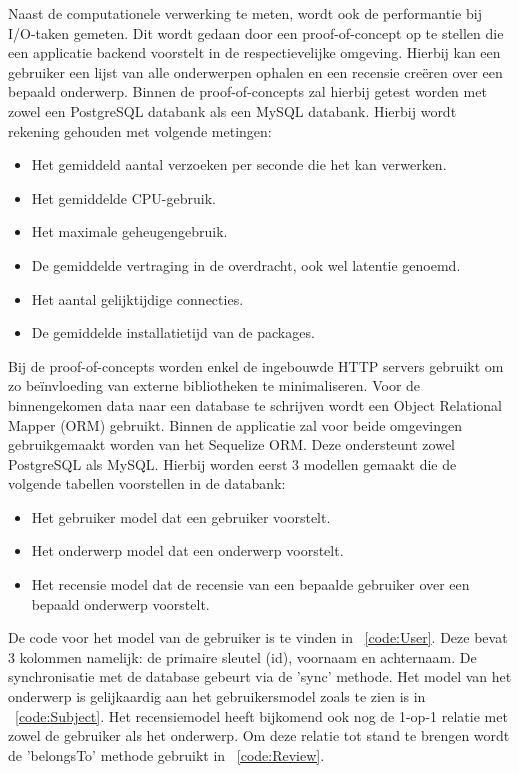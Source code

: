 Naast de computationele verwerking te meten, wordt ook de performantie bij I/O-taken gemeten.
Dit wordt gedaan door een proof-of-concept op te stellen die een applicatie backend voorstelt in de respectievelijke omgeving.
Hierbij kan een gebruiker een lijst van alle onderwerpen ophalen en een recensie creëren over een bepaald onderwerp. 
Binnen de proof-of-concepts zal hierbij getest worden met zowel een PostgreSQL databank als een MySQL databank.
Hierbij wordt rekening gehouden met volgende metingen:
\begin{itemize}
    \item Het gemiddeld aantal verzoeken per seconde die het kan verwerken.
    \item Het gemiddelde CPU-gebruik.
    \item Het maximale geheugengebruik.
    \item De gemiddelde vertraging in de overdracht, ook wel latentie genoemd.
    \item Het aantal gelijktijdige connecties.
    \item De gemiddelde installatietijd van de packages.
\end{itemize}
Bij de proof-of-concepts worden enkel de ingebouwde HTTP servers gebruikt om zo beïnvloeding van externe bibliotheken te minimaliseren.
Voor de binnengekomen data naar een database te schrijven wordt een Object Relational Mapper (ORM) gebruikt.
Binnen de applicatie zal voor beide omgevingen gebruikgemaakt worden van het Sequelize ORM. Deze ondersteunt zowel PostgreSQL als MySQL.
Hierbij worden eerst 3 modellen gemaakt die de volgende tabellen voorstellen in de databank:
\begin{itemize}
  \item Het gebruiker model dat een gebruiker voorstelt.
  \item Het onderwerp model dat een onderwerp voorstelt.
  \item Het recensie model dat de recensie van een bepaalde gebruiker over een bepaald onderwerp voorstelt.
\end{itemize}
De code voor het model van de gebruiker is te vinden in ~\ref{code:User}. Deze bevat 3 kolommen namelijk: de primaire sleutel (id), voornaam en achternaam.
De synchronisatie met de database gebeurt via de 'sync' methode.
Het model van het onderwerp is gelijkaardig aan het gebruikersmodel zoals te zien is in ~\ref{code:Subject}. Het recensiemodel heeft bijkomend 
ook nog de 1-op-1 relatie met zowel de gebruiker als het onderwerp.
Om deze relatie tot stand te brengen wordt de 'belongsTo' methode gebruikt in ~\ref{code:Review}. 
